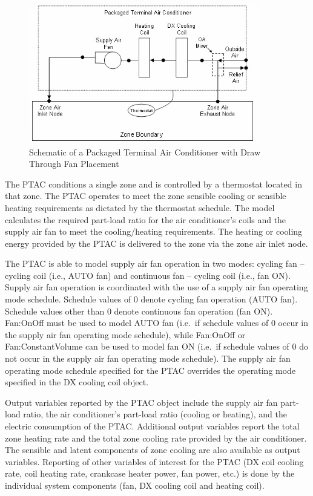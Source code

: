 \begin{figure}[hbtp] %
\centering
\includegraphics[width=0.9\textwidth, height=0.9\textheight, keepaspectratio=true]{media/image7172.png}
\caption{Schematic of a Packaged Terminal Air Conditioner with Draw Through Fan Placement \protect \label{fig:schematic-of-a-packaged-terminal-air}}
\end{figure}

The PTAC conditions a single zone and is controlled by a thermostat located in that zone. The PTAC operates to meet the zone sensible cooling or sensible heating requirements as dictated by the thermostat schedule. The model calculates the required part-load ratio for the air conditioner's coils and the supply air fan to meet the cooling/heating requirements. The heating or cooling energy provided by the PTAC is delivered to the zone via the zone air inlet node.

The PTAC is able to model supply air fan operation in two modes: cycling fan -- cycling coil (i.e., AUTO fan) and continuous fan -- cycling coil (i.e., fan ON). Supply air fan operation is coordinated with the use of a supply air fan operating mode schedule. Schedule values of 0 denote cycling fan operation (AUTO fan). Schedule values other than 0 denote continuous fan operation (fan ON). Fan:OnOff must be used to model AUTO fan (i.e.~if schedule values of 0 occur in the supply air fan operating mode schedule), while Fan:OnOff or Fan:ConstantVolume can be used to model fan ON (i.e.~if schedule values of 0 do not occur in the supply air fan operating mode schedule). The supply air fan operating mode schedule specified for the PTAC overrides the operating mode specified in the DX cooling coil object.

Output variables reported by the PTAC object include the supply air fan part-load ratio, the air conditioner's part-load ratio (cooling or heating), and the electric consumption of the PTAC. Additional output variables report the total zone heating rate and the total zone cooling rate provided by the air conditioner. The sensible and latent components of zone cooling are also available as output variables. Reporting of other variables of interest for the PTAC (DX coil cooling rate, coil heating rate, crankcase heater power, fan power, etc.) is done by the individual system components (fan, DX cooling coil and heating coil).

